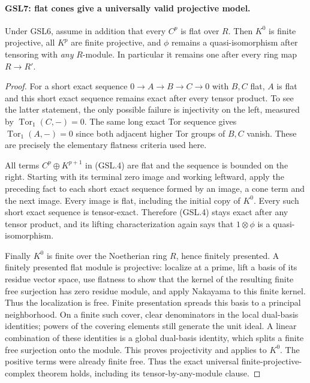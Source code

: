 \documentclass[11pt,a4paper]{article}
\numberwithin{equation}{section}
\theoremstyle{remark}\newtheorem{remark}[theorem]{Remark}
\begin{document}
\paragraph{GSL7: flat cones give a universally valid projective model.}
\label{claim:GSL7}
Under GSL6, assume in addition that every $C^p$ is flat over $R$.
Then $K^0$ is finite projective, all $K^p$ are finite projective,
and $\phi$ remains a quasi-isomorphism after tensoring with
\emph{any} $R$-module.  In particular it remains one after every
ring map $R\to R'$.

\begin{proof}
For a short exact sequence $0\to A\to B\to C\to0$ with $B,C$
flat, $A$ is flat and this short exact sequence remains exact after
every tensor product.  To see the latter statement, the only possible
failure is injectivity on the left, measured by
$\operatorname{Tor}_1(C,-)=0$.  The same long exact Tor sequence
gives $\operatorname{Tor}_1(A,-)=0$ since both adjacent higher Tor
groups of $B,C$ vanish.  These are precisely the elementary flatness
criteria used here.

All terms $C^p\oplus K^{p+1}$ in (GSL.4) are flat and the sequence
is bounded on the right.  Starting with its terminal zero image and
working leftward, apply the preceding fact to each short exact sequence
formed by an image, a cone term and the next image.  Every image is
flat, including the initial copy of $K^0$.  Every such short exact
sequence is tensor-exact.  Therefore (GSL.4) stays exact after any
tensor product, and its lifting characterization again says that
$1\otimes\phi$ is a quasi-isomorphism.

Finally $K^0$ is finite over the Noetherian ring $R$, hence finitely
presented.  A finitely presented flat module is projective: localize
at a prime, lift a basis of its residue vector space, use flatness to
show that the kernel of the resulting finite free surjection has
zero residue module, and apply Nakayama to this finite kernel.
Thus the localization is free.  Finite presentation spreads this
basis to a principal neighborhood.  On a finite such cover, clear
denominators in the local dual-basis identities; powers of the
covering elements still generate the unit ideal.  A linear
combination of these identities is a global dual-basis identity,
which splits a finite free surjection onto the module.
This proves projectivity and applies to $K^0$.  The positive
terms were already finite free.  Thus the exact universal
finite-projective-complex theorem holds, including its
tensor-by-any-module clause.
\end{proof}
\end{document}
